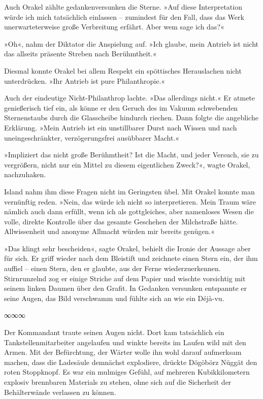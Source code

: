 Auch Orakel zählte gedankenversunken die Sterne. »Auf diese Interpretation würde ich mich tatsächlich einlassen – zumindest für den Fall, dass das Werk unerwarteterweise große Verbreitung erfährt. Aber wem sage ich das?«

»Oh«, nahm der Diktator die Anspielung auf. »Ich glaube, mein Antrieb ist nicht das allseits präsente Streben nach Berühmtheit.«

Diesmal konnte Orakel bei allem Respekt ein spöttisches Herauslachen nicht unterdrücken. »Ihr Antrieb ist pure Philanthropie.«

Auch der eindeutige Nicht-Philanthrop lachte. »Das allerdings nicht.« Er atmete genießerisch tief ein, als könne er den Geruch des im Vakuum schwebenden Sternenstaubs durch die Glasscheibe hindurch riechen. Dann folgte die angebliche Erklärung. »Mein Antrieb ist ein unstillbarer Durst nach Wissen und nach uneingeschränkter, verzögerungsfrei ausübbarer Macht.«

»Impliziert das nicht große Berühmtheit? Ist die Macht, und jeder Versuch, sie zu vergrößern, nicht nur ein Mittel zu diesem eigentlichen Zweck?«, wagte Orakel, nachzuhaken.

Island nahm ihm diese Fragen nicht im Geringsten übel. Mit Orakel konnte man vernünftig reden. »Nein, das würde ich nicht so interpretieren. Mein Traum wäre nämlich auch dann erfüllt, wenn ich als gottgleiches, aber namenloses Wesen die volle, direkte Kontrolle über das gesamte Geschehen der Milchstraße hätte. Allwissenheit und anonyme Allmacht würden mir bereits genügen.«

»Das klingt sehr bescheiden«, sagte Orakel, behielt die Ironie der Aussage aber für sich. Er griff wieder nach dem Bleistift und zeichnete einen Stern ein, der ihm auffiel – einen Stern, den er glaubte, aus der Ferne wiederzuerkennen. Stirnrunzelnd zog er einige Striche auf dem Papier und wischte vorsichtig mit seinem linken Daumen über den Grafit. In Gedanken versunken entspannte er seine Augen, das Bild verschwamm und fühlte sich an wie ein Déjà-vu.

\begin{center}
∞∞∞
\end{center}

Der Kommandant traute seinen Augen nicht. Dort kam tatsächlich ein Tankstellenmitarbeiter angelaufen und winkte bereits im Laufen wild mit den Armen. Mit der Befürchtung, der Wärter wolle ihn wohl darauf aufmerksam machen, dass die Ladesäule demnächst explodiere, drückte Dögöbörz Nüggät den roten Stoppknopf. Es war ein mulmiges Gefühl, auf mehreren Kubikkilometern explosiv brennbaren Materials zu stehen, ohne sich auf die Sicherheit der Behälterwände verlassen zu können.

